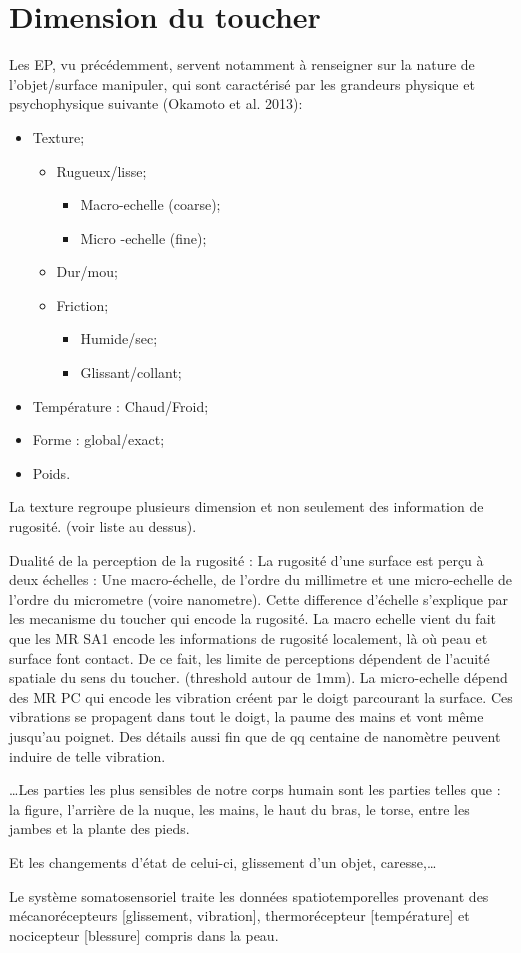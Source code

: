 \section{Dimension du toucher}
Les EP, vu précédemment, servent notamment à renseigner sur la nature de l’objet/surface manipuler, qui sont caractérisé par les grandeurs physique et psychophysique suivante (Okamoto et al. 2013):
\begin{itemize}
	\item Texture;
	\begin{itemize}
		\item Rugueux/lisse;
		\begin{itemize}
			\item Macro-echelle (coarse);
			\item Micro -echelle (fine);
		\end{itemize}
		\item Dur/mou;
		\item Friction;
		\begin{itemize}
			\item Humide/sec;
			\item Glissant/collant;
		\end{itemize}
	\end{itemize}
	\item Température : Chaud/Froid;
	\item Forme : global/exact;
	\item Poids.
\end{itemize}
La texture regroupe plusieurs dimension et non seulement des information de rugosité. (voir liste au dessus).\par
Dualité de la perception de la rugosité : La rugosité d’une surface est perçu à deux échelles : Une macro-échelle, de l’ordre du millimetre et une micro-echelle de l’ordre du micrometre (voire nanometre). Cette difference d’échelle s’explique par les mecanisme du toucher qui encode la rugosité. La macro echelle vient du fait que les MR SA1 encode les informations de rugosité localement, là où peau et surface font contact. De ce fait, les limite de perceptions dépendent de l’acuité spatiale du sens du toucher. (threshold autour de 1mm). La micro-echelle dépend des MR PC qui encode les vibration créent par le doigt parcourant la surface. Ces vibrations se propagent dans tout le doigt, la paume des mains et vont même jusqu’au poignet. Des détails aussi fin que de qq centaine de nanomètre peuvent induire de telle vibration.\par
…Les parties les plus sensibles de notre corps humain sont les parties telles que : la figure, l’arrière de la nuque, les mains, le haut du bras, le torse, entre les jambes et la plante des pieds.\par
Et les changements d’état de celui-ci, glissement d’un objet, caresse,…\par
Le système somatosensoriel traite les données spatiotemporelles provenant des mécanorécepteurs [glissement, vibration], thermorécepteur [température] et nocicepteur [blessure] compris dans la peau.\par


